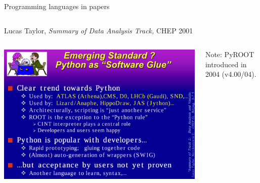 \documentclass[aspectratio=169]{beamer}
\begin{document}
\begin{frame}{Programming languages in  papers}
\vspace{0.35 cm}
\begin{columns}
\end{columns}
\end{frame}

\begin{frame}{Lucas Taylor, {\it Summary of Data Analysis Track,} CHEP 2001}
\vspace{0.25 cm}
\begin{columns}

\includegraphics[width=\linewidth]{chep-2001-python.png}

Note: PyROOT introduced in 2004 (v4.00/04).
\end{columns}
\end{frame}
\end{document}
